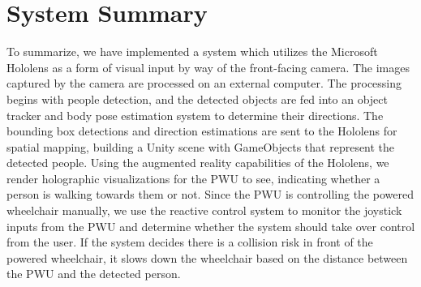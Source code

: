 \section{System Summary}
To summarize, we have implemented a system which utilizes the Microsoft Hololens as a form of visual input by way of the front-facing camera. The images captured by the camera are processed on an external computer. The processing begins with people detection, and the detected objects are fed into an object tracker and body pose estimation system to determine their directions. The bounding box detections and direction estimations are sent to the Hololens for spatial mapping, building a Unity scene with GameObjects that represent the detected people. Using the augmented reality capabilities of the Hololens, we render holographic visualizations for the PWU to see, indicating whether a person is walking towards them or not. Since the PWU is controlling the powered wheelchair manually, we use the reactive control system to monitor the joystick inputs from the PWU and determine whether the system should take over control from the user. If the system decides there is a collision risk in front of the powered wheelchair, it slows down the wheelchair based on the distance between the PWU and the detected person.